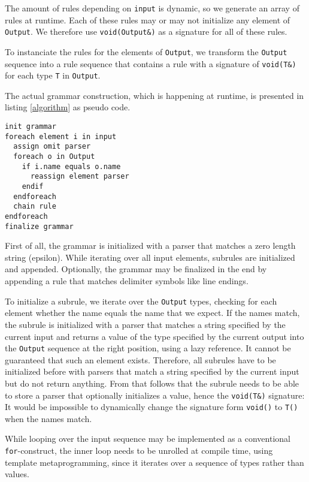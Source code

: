 \documentclass[a4paper,parskip=half,twocolumn]{scrartcl}
\begin{document}
The amount of rules depending on \texttt{input} is dynamic, so we generate an
array of rules at runtime. Each of these rules may or may not initialize any
element of \texttt{Output}. We therefore use \texttt{void(Output\&)} as a
signature for all of these rules.

To instanciate the rules for the elements of \texttt{Output}, we transform
the \texttt{Output} sequence into a rule sequence that contains a rule with a
signature of \texttt{void(T\&)} for each type \texttt{T} in \texttt{Output}.

The actual grammar construction, which is happening at runtime, is presented in
listing \ref{algorithm} as pseudo code.

\begin{lstlisting}[frame=tb,label=algorithm,caption=grammar construction algorithm]
init grammar
foreach element i in input
  assign omit parser
  foreach o in Output
    if i.name equals o.name
      reassign element parser
    endif
  endforeach
  chain rule
endforeach
finalize grammar
\end{lstlisting}

First of all, the grammar is initialized with a parser that matches a zero
length string (epsilon). While iterating over all input elements, subrules are
initialized and appended. Optionally, the grammar may be finalized in the end by
appending a rule that matches delimiter symbols like line endings.

To initialize a subrule, we iterate over the \texttt{Output} types, checking
for each element whether the name equals the name that we expect. If the names
match, the subrule is initialized with a parser that matches a string
specified by the current input and returns a value of the type specified by the
current output into the \texttt{Output} sequence at the right position, using a
lazy reference. It cannot be guaranteed that such an element exists. Therefore,
all subrules have to be initialized before with parsers that match a string
specified by the current input but do not return anything. From that follows
that the subrule needs to be able to store a parser that optionally initializes
a value, hence the \texttt{void(T\&)} signature: It would be impossible to
dynamically change the signature form \texttt{void()} to \texttt{T()} when the
names match.

While looping over the input sequence may be implemented as a conventional
\texttt{for}-construct, the inner loop needs to be unrolled at compile time,
using template metaprogramming, since it iterates over a sequence of types
rather than values.
\end{document}
